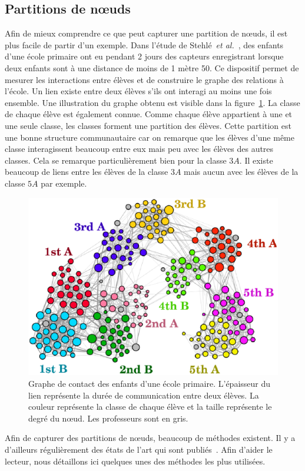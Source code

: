 \subsection{Partitions de n\oe{}uds}
\label{subsec:Part_noeuds}
Afin de mieux comprendre ce que peut capturer une partition de n\oe{}uds, il est plus facile de partir d'un exemple.
Dans l'étude de Stehlé~\emph{et al.}~\cite{Stehle2011}, des enfants d'une école primaire ont eu pendant 2 jours des capteurs enregistrant lorsque deux enfants sont à une distance de moins de 1 mètre 50.
Ce dispositif permet de mesurer les interactions entre élèves et de construire le graphe des relations à l'école.
Un lien existe entre deux élèves s'ils ont interagi au moins une fois ensemble.
Une illustration du graphe obtenu est visible dans la figure~\ref{fig:ecole_primaire}.
La classe de chaque élève est également connue.
Comme chaque élève appartient à une et une seule classe, les classes forment une partition des élèves.
Cette partition est une bonne structure communautaire car on remarque que les élèves d'une même classe interagissent beaucoup entre eux mais peu avec les élèves des autres classes.
Cela se remarque particulièrement bien pour la classe $3A$.
Il existe beaucoup de liens entre les élèves de la classe $3A$ mais aucun avec les élèves de la classe $5A$ par exemple.

\begin{figure}
\centering
\includegraphics[width=0.6\linewidth]{img/Intro/ecole_primaire}
\caption{Graphe de contact des enfants d'une école primaire. L'épaisseur du lien représente la durée de communication entre deux élèves. La couleur représente la classe de chaque élève et la taille représente le degré du n\oe{}ud. Les professeurs sont en gris.\protect\footnotemark}
\label{fig:ecole_primaire}
\end{figure}

Afin de capturer des partitions de n\oe{}uds, beaucoup de méthodes existent.
Il y a d'ailleurs régulièrement des états de l'art qui sont publiés~\cite{Fortunato2010,Plantie2013a, Malliaros2013a, Harenberg2014a}.
Afin d'aider le lecteur, nous détaillons ici quelques unes des méthodes les plus utilisées.

